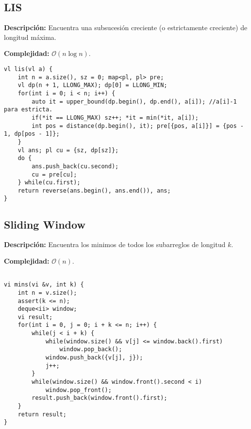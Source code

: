 \documentclass[twocolumn]{article}
\begin{document}
\subsection{LIS}
\begin{footnotesize}{\bf Descripción:} Encuentra una subsucesión creciente (o estrictamente creciente) de longitud máxima.


{\bf Complejidad:} $\mathcal{O}(n \log n)$.
\end{footnotesize}\lstset{basicstyle=\footnotesize\ttfamily,breaklines=true,tabsize=2,language=C++,frame=leftline, numbers=left, numberstyle=\tiny, numbersep=5pt}
\begin{lstlisting}
vl lis(vl a) {
	int n = a.size(), sz = 0; map<pl, pl> pre;
	vl dp(n + 1, LLONG_MAX); dp[0] = LLONG_MIN;
	for(int i = 0; i < n; i++) {
		auto it = upper_bound(dp.begin(), dp.end(), a[i]); //a[i]-1 para estricta.
		if(*it == LLONG_MAX) sz++; *it = min(*it, a[i]);
		int pos = distance(dp.begin(), it); pre[{pos, a[i]}] = {pos - 1, dp[pos - 1]};
	}
	vl ans; pl cu = {sz, dp[sz]};
	do {
		ans.push_back(cu.second);
		cu = pre[cu];
	} while(cu.first);
	return reverse(ans.begin(), ans.end()), ans;
}
\end{lstlisting}
\subsection{Sliding Window}
\begin{footnotesize}{\bf Descripción:} Encuentra los minimos de todos los subarreglos de longitud $k$.


{\bf Complejidad:} $\mathcal{O}(n)$.
\end{footnotesize}\lstset{basicstyle=\footnotesize\ttfamily,breaklines=true,tabsize=2,language=C++,frame=leftline, numbers=left, numberstyle=\tiny, numbersep=5pt}
\begin{lstlisting}

vi mins(vi &v, int k) {
	int n = v.size();
	assert(k <= n);
	deque<ii> window;
	vi result;
	for(int i = 0, j = 0; i + k <= n; i++) {
		while(j < i + k) {
			while(window.size() && v[j] <= window.back().first)
				window.pop_back();
			window.push_back({v[j], j});
			j++;
		}
		while(window.size() && window.front().second < i)
			window.pop_front();
		result.push_back(window.front().first);
	}
	return result;
}

\end{lstlisting}
\end{document}
